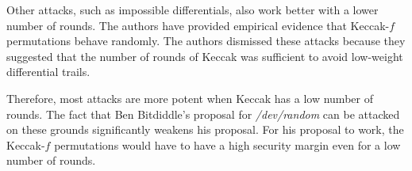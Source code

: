 \documentclass[psamsfonts]{amsart}
\begin{document}
Other attacks, such as impossible differentials, also work better with a lower number of rounds. The authors have provided empirical evidence that Keccak-$f$ permutations behave randomly. The authors dismissed these attacks because they suggested that the number of rounds of Keccak was sufficient to avoid low-weight differential trails.

Therefore, most attacks are more potent when Keccak has a low number of rounds. The fact that Ben Bitdiddle's proposal for \emph{/dev/random} can be attacked on these grounds significantly weakens his proposal. For his proposal to work, the Keccak-$f$ permutations would have to have a high security margin even for a low number of rounds.
\end{document}
